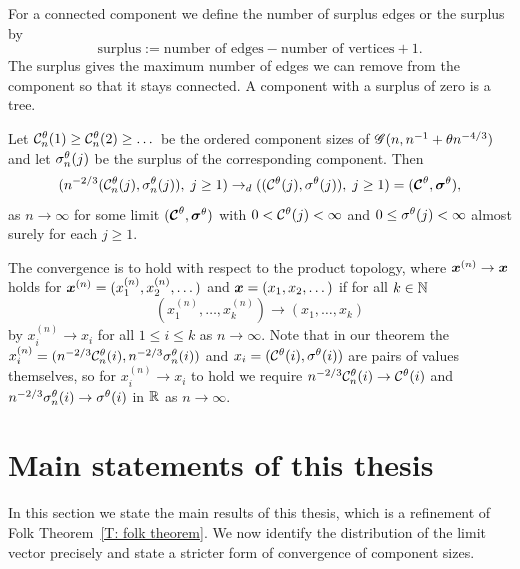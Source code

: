 For a connected component we define the number of surplus edges or the surplus by
\begin{equation}
	\text{surplus} := \text{number of edges} - \text{number of vertices} + 1.
\end{equation}
The surplus gives the maximum number of edges we can remove from the component so that it stays connected.
A component with a surplus of zero is a tree.

\begin{folktheorem} \label{T: folk theorem}
	Let $\mathcal{C}^{\theta}_n(1) \geq \mathcal{C}^{\theta}_n(2) \geq \dots$ be the ordered component sizes of 
	$\mathscr{G}(n, n^{-1} + \theta n^{-4 / 3})$ and let $\mathcal{\sigma}^{\theta}_n(j)$ be the surplus of the corresponding component.
	Then
	\begin{equation}
		( n^{-2 / 3} ( \mathcal{C}^{\theta}_n(j), \mathcal{\sigma}^{\theta}_n(j) ), \; j \geq 1 ) 
		\rightarrow_d
		( (\mathcal{C}^{\theta}(j), \mathcal{\sigma}^{\theta}(j)), \; j \geq 1 )
		= ( \boldsymbol{\mathcal{C}}^{\theta}, \boldsymbol{\mathcal{\sigma}}^{\theta} ),
	\end{equation}
	as $n \rightarrow \infty$ for some limit $( \boldsymbol{\mathcal{C}}^{\theta}, \boldsymbol{\mathcal{\sigma}}^{\theta} )$
	with $0 < \mathcal{C}^{\theta}(j) < \infty$ and $0 \leq \mathcal{\sigma}^{\theta}(j) < \infty$ almost surely for each $j \geq 1$.
\end{folktheorem}

The convergence is to hold with respect to the product topology, 
where $\boldsymbol{x}^{(n)} \rightarrow \boldsymbol{x}$ holds for $\boldsymbol{x}^{(n)} = (x^{(n)}_1, x^{(n)}_2, \dots)$ and $\boldsymbol{x} = (x_1, x_2, \dots)$
if for all $k \in \mathbb{N}$
\begin{equation}
	(x^{(n)}_1, \dots, x^{(n)}_k) \rightarrow (x_1, \dots,  x_k)
\end{equation}
by $x^{(n)}_i \rightarrow x_i$ for all $1 \leq i \leq k$ as $n \rightarrow \infty$.
Note that in our theorem the $x^{(n)}_i = ( n^{-2 / 3} \mathcal{C}^{\theta}_n(i), n^{-2 / 3} \mathcal{\sigma}^{\theta}_n(i))$ and $x_i = (\mathcal{C}^{\theta}(i), \mathcal{\sigma}^{\theta}(i))$ are pairs of values themselves,
so for $x^{(n)}_i \rightarrow x_i$ to hold we require 
$n^{-2 / 3}  \mathcal{C}^{\theta}_n(i) \rightarrow \mathcal{C}^{\theta}(i)$ and $n^{-2 / 3} \mathcal{\sigma}^{\theta}_n(i) \rightarrow \mathcal{\sigma}^{\theta}(i)$ 
in $\mathbb{R}$ as $n \rightarrow \infty$.


\section{Main statements of this thesis}

In this section we state the main results of this thesis,
which is a refinement of Folk Theorem~\ref{T: folk theorem}.
We now identify the distribution of the limit vector precisely and state a stricter form of convergence of component sizes.

